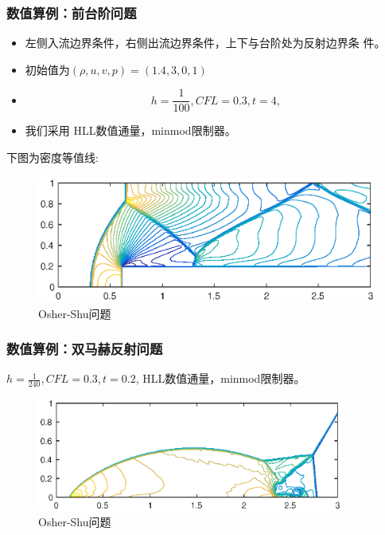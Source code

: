 \documentclass[8pt,mathserif]{beamer}
\begin{document}
\begin{frame}
  \frametitle{数值算例：前台阶问题}
  \begin{itemize}
    \item 
  左侧入流边界条件，右侧出流边界条件，上下与台阶处为反射边界条
  件。
   \item  初始值为$(\rho,u,v,p)=(1.4,3,0,1)$ 
   \item  
   $$h=\frac{1}{100},CFL=0.3,t=4,$$ 
   \item 我们采用 HLL数值通量，minmod限制器。
    \end{itemize}
   下图为密度等值线:
\end{frame}
\begin{frame}
   \begin{figure}[H]
  \centering
    \includegraphics[width=1.0\textwidth]{../doc/images/ForwardStep-300-100-HLL-minmod.eps}
  \caption{Osher-Shu问题}
\end{figure}
\end{frame}

\begin{frame}
  \frametitle{数值算例：双马赫反射问题}
  $h=\frac{1}{240},CFL=0.3,t=0.2$, HLL数值通量，minmod限制器。
\begin{figure}[H]
  \begin{center}
    \includegraphics[width=0.9\textwidth]{../doc/images/MachReflection-960-240-MC.eps}
  \end{center}
  \caption{Osher-Shu问题}
\end{figure}
\end{frame}
\end{document}

